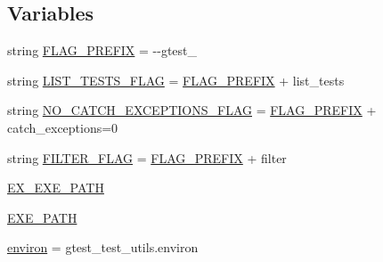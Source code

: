 \subsection*{Variables}
\begin{DoxyCompactItemize}
\item 
string \mbox{\hyperlink{namespacegoogletest-master_1_1googletest_1_1test_1_1googletest-catch-exceptions-test_a5a6d0124f5f04b440948d2b7f8fe38ed}{F\+L\+A\+G\+\_\+\+P\+R\+E\+F\+IX}} = \textquotesingle{}-\/-\/gtest\+\_\+\textquotesingle{}
\item 
string \mbox{\hyperlink{namespacegoogletest-master_1_1googletest_1_1test_1_1googletest-catch-exceptions-test_a723e7330541923823ea13af2f2c31e9b}{L\+I\+S\+T\+\_\+\+T\+E\+S\+T\+S\+\_\+\+F\+L\+AG}} = \mbox{\hyperlink{namespacegoogletest-master_1_1googletest_1_1test_1_1googletest-catch-exceptions-test_a5a6d0124f5f04b440948d2b7f8fe38ed}{F\+L\+A\+G\+\_\+\+P\+R\+E\+F\+IX}} + \textquotesingle{}list\+\_\+tests\textquotesingle{}
\item 
string \mbox{\hyperlink{namespacegoogletest-master_1_1googletest_1_1test_1_1googletest-catch-exceptions-test_a1d7303a74a12ca7dc2dc35c39d9b19a2}{N\+O\+\_\+\+C\+A\+T\+C\+H\+\_\+\+E\+X\+C\+E\+P\+T\+I\+O\+N\+S\+\_\+\+F\+L\+AG}} = \mbox{\hyperlink{namespacegoogletest-master_1_1googletest_1_1test_1_1googletest-catch-exceptions-test_a5a6d0124f5f04b440948d2b7f8fe38ed}{F\+L\+A\+G\+\_\+\+P\+R\+E\+F\+IX}} + \textquotesingle{}catch\+\_\+exceptions=0\textquotesingle{}
\item 
string \mbox{\hyperlink{namespacegoogletest-master_1_1googletest_1_1test_1_1googletest-catch-exceptions-test_a953668158e0c32848380f097e1c1d3f2}{F\+I\+L\+T\+E\+R\+\_\+\+F\+L\+AG}} = \mbox{\hyperlink{namespacegoogletest-master_1_1googletest_1_1test_1_1googletest-catch-exceptions-test_a5a6d0124f5f04b440948d2b7f8fe38ed}{F\+L\+A\+G\+\_\+\+P\+R\+E\+F\+IX}} + \textquotesingle{}filter\textquotesingle{}
\item 
\mbox{\hyperlink{namespacegoogletest-master_1_1googletest_1_1test_1_1googletest-catch-exceptions-test_a721cc5d874c84f79d6df66e4bbc5c500}{E\+X\+\_\+\+E\+X\+E\+\_\+\+P\+A\+TH}}
\item 
\mbox{\hyperlink{namespacegoogletest-master_1_1googletest_1_1test_1_1googletest-catch-exceptions-test_a300e82ace998132cf7010379cd91095a}{E\+X\+E\+\_\+\+P\+A\+TH}}
\item 
\mbox{\hyperlink{namespacegoogletest-master_1_1googletest_1_1test_1_1googletest-catch-exceptions-test_a3b2bff4e4eb736ed36b2075183fe8d8a}{environ}} = gtest\+\_\+test\+\_\+utils.\+environ

\end{DoxyCompactItemize}
